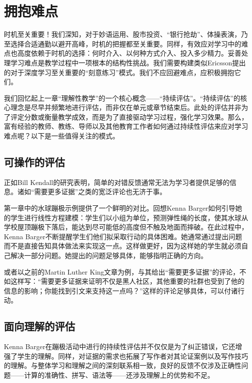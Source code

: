 \section*{拥抱难点}

时机至关重要！我们深知，对于妙语运用、股市投资、“银行抢劫”、体操表演，乃至选择合适通勤以避开高峰，时机的把握都至关重要。同样，有效应对学习中的难点也高度依赖于时机的选择：何时介入、以何种方式介入、投入多少精力。妥善处理学习难点是教学过程中一项根本的结构性挑战。我们需要构建类似Ericsson提出的对于深度学习至关重要的“刻意练习”模式。我们不应回避难点，应积极拥抱它们。

我们回忆起上一章“理解性教学”的一个核心概念——“持续评估”。“持续评估”的核心理念是尽早并频繁地进行评估，而非仅在单元或章节结束后。此处的评估并非为了评定分数或衡量教学成效，而是为了直接驱动学习过程，强化学习效果。那么，富有经验的教师、教练、导师以及其他教育工作者如何通过持续性评估来应对学习难点呢？以下是一些值得关注的模式。

\subsection*{可操作的评估}

正如Bill Kendall的研究表明，简单的对错反馈通常无法为学习者提供足够的信息。诸如“需要更多证据”之类的宽泛评论也无济于事。

第一章中的水球蹦极示例提供了一个鲜明的对比。回想Kenna Barger如何引导她的学生进行线性方程建模：学生们以小组为单位，预测弹性绳的长度，使其水球从学校屋顶蹦极下落后，能达到尽可能低的高度但不触及地面而摔破。在此过程中，Kenna Barger不断提醒学生们他们拟采取行动的具体困难。她通常通过提出问题而不是直接告知具体做法来实现这一点。这样做更好，因为这样她的学生就必须自己解决一部分问题。她提出的问题足够具体，能够指明正确的方向。

或者以之前的Martin Luther King文章为例，与其给出“需要更多证据”的评论，不如这样写：“需要更多证据来证明不仅是黑人社区，其他重要的社群也受到了他的信息的影响；你能找到引文来支持这一点吗？”这样的评论足够具体，可以付诸行动。

\subsection*{面向理解的评估}

Kenna Barger在蹦极活动中进行的持续性评估并不仅仅是为了纠正错误，它还增强了学生的理解。同样，对证据的需求也拓展了写作者对其论证案例以及写作技巧的理解。与整体学习和理解之间的深刻联系相一致，良好的反馈不仅涉及正确性问题——计算的准确性、拼写、语法等——还涉及理解上的优势和不足。

